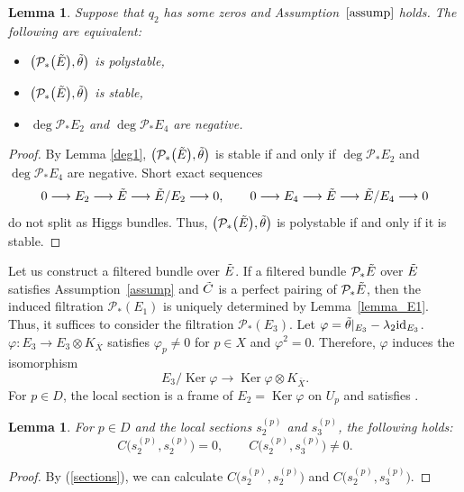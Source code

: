 \documentclass[pdftex]{sigma}
\numberwithin{equation}{section}
\newtheorem{Lemma}[Theorem]{Lemma}
\newcommand{\id}{\mathrm{id}}
\newcommand{\Ker}{\operatorname{Ker}}
\begin{document}
\begin{Lemma}\label{polystable}
 Suppose that $q_2$ has some zeros and Assumption~$\ref{assump}$ holds. The following are equivalent:
 \begin{itemize}\itemsep=0pt
 \item $\bigl(\mathcal{P}_*\bigl(\Tilde{E}\bigr),\Tilde{\theta}\bigr)$ is polystable,
 \item $\bigl(\mathcal{P}_*\bigl(\Tilde{E}\bigr),\Tilde{\theta}\bigr)$ is stable,
 \item $\deg{\mathcal{P}_{*}E_2}$ and $\deg{\mathcal{P}_{*}E_4}$ are negative.
 \end{itemize}
\end{Lemma}
\begin{proof}
 By Lemma \ref{deg1}, $\bigl(\mathcal{P}_*\bigl(\Tilde{E}\bigr),\Tilde{\theta}\bigr)$ is stable if and only if $\deg{\mathcal{P}_{*}E_2}$ and $\deg{\mathcal{P}_{*}E_4}$ are negative.
 Short exact sequences
 \begin{align*}
 0\longrightarrow E_2\longrightarrow \Tilde{E} \longrightarrow \Tilde{E}/E_2\longrightarrow 0,\qquad
 0\longrightarrow E_4\longrightarrow \Tilde{E} \longrightarrow \Tilde{E}/E_4\longrightarrow 0
 \end{align*}
 do not split as Higgs bundles. Thus, $\bigl(\mathcal{P}_*\bigl(\Tilde{E}\bigr),\Tilde{\theta}\bigr)$ is polystable if and only if it is stable.
\end{proof}

Let us construct a filtered bundle over $\Tilde{E}$. If a filtered bundle $\mathcal{P}_{*}\Tilde{E}$ over $\Tilde{E}$ satisfies Assumption~\ref{assump} and $\Tilde{C}$ is a perfect pairing of $\mathcal{P}_{*}\Tilde{E}$, then the induced filtration $\mathcal{P}_*(E_1)$ is uniquely determined by Lemma~\ref{lemma_E1}. Thus, it suffices to consider the filtration $\mathcal{P}_*(E_3)$.
Let $\varphi = \Tilde{\theta}|_{E_3}-\lambda_2 \id_{E_3}$. $\varphi\colon E_3\to E_3 \otimes K_{\overline{X}}$ satisfies $\varphi_p\neq 0$ for $p\in X$ and $\varphi^2=0$. Therefore, $\varphi$ induces the isomorphism%
\begin{equation}\label{isomorphism}
 E_3/\Ker{\varphi} \longrightarrow \Ker{\varphi}\otimes K_{\overline{X}}.
\end{equation}
For $p\in D$, the local section  is a frame of $E_2=\Ker{\varphi}$ on $U_p$ and  satisfies .
\begin{Lemma}\label{section_C}
 For $p\in D$ and the local sections $s^{(p)}_2$ and $s^{(p)}_3$, the following holds:
 \begin{equation*}
 C\bigl(s^{(p)}_2,s^{(p)}_2\bigr) = 0,\qquad C\bigl(s^{(p)}_2,s^{(p)}_3\bigr) \neq 0.
 \end{equation*}
\end{Lemma}
\begin{proof}
 By (\ref{sections}), we can calculate $C\bigl(s^{(p)}_2,s^{(p)}_2\bigr)$ and $C\bigl(s^{(p)}_2,s^{(p)}_3\bigr)$.
\end{proof}
\end{document}
